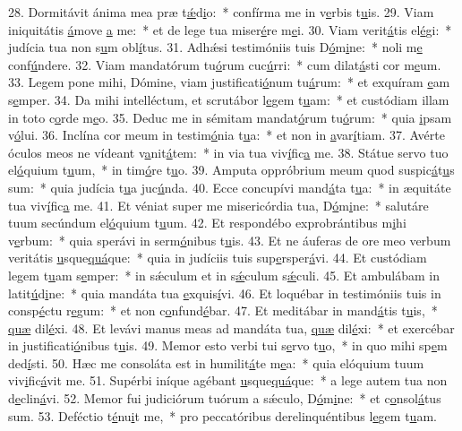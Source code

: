 28. Dormitávit ánima mea præ t\uline{ǽ}d\uline{i}o:~* confírma me in v\uline{e}rbis t\uline{u}is.
29. Viam iniquitátis \uline{á}move \uline{a} me:~* et de lege tua miser\uline{é}re m\uline{e}i.
30. Viam verit\uline{á}tis el\uline{é}gi:~* judícia tua non s\uline{u}m obl\uline{í}tus.
31. Adhǽsi testimóniis tuis D\uline{ó}m\uline{i}ne:~* noli m\uline{e} conf\uline{ú}ndere.
32. Viam mandatórum tu\uline{ó}rum cuc\uline{ú}rri:~* cum dilat\uline{á}sti cor m\uline{e}um.
33. Legem pone mihi, Dómine, viam justificati\uline{ó}num tu\uline{á}rum:~* et exquíram \uline{e}am s\uline{e}mper.
34. Da mihi intelléctum, et scrutábor l\uline{e}gem t\uline{u}am:~* et custódiam illam in toto c\uline{o}rde m\uline{e}o.
35. Deduc me in sémitam mandat\uline{ó}rum tu\uline{ó}rum:~* quia \uline{i}psam v\uline{ó}lui.
36. Inclína cor meum in testim\uline{ó}nia t\uline{u}a:~* et non in \uline{a}var\uline{í}tiam.
37. Avérte óculos meos ne vídeant v\uline{a}nit\uline{á}tem:~* in via tua viv\uline{í}fic\uline{a} me.
38. Státue servo tuo el\uline{ó}quium t\uline{u}um,~* in tim\uline{ó}re t\uline{u}o.
39. Amputa oppróbrium meum quod suspic\uline{á}t\uline{u}s sum:~* quia judícia t\uline{u}a juc\uline{ú}nda.
40. Ecce concupívi mand\uline{á}ta t\uline{u}a:~* in æquitáte tua viv\uline{í}fic\uline{a} me.
41. Et véniat super me misericórdia tua, D\uline{ó}m\uline{i}ne:~* salutáre tuum secúndum el\uline{ó}quium t\uline{u}um.
42. Et respondébo exprobrántibus m\uline{i}hi v\uline{e}rbum:~* quia sperávi in serm\uline{ó}nibus t\uline{u}is.
43. Et ne áuferas de ore meo verbum veritátis \uline{u}sque\uline{quá}que:~* quia in judíciis tuis sup\uline{e}rsper\uline{á}vi.
44. Et custódiam legem t\uline{u}am s\uline{e}mper:~* in sǽculum et in s\uline{ǽ}culum s\uline{ǽ}culi.
45. Et ambulábam in latit\uline{ú}d\uline{i}ne:~* quia mandáta tua \uline{e}xquis\uline{í}vi.
46. Et loquébar in testimóniis tuis in consp\uline{é}ctu r\uline{e}gum:~* et non c\uline{o}nfund\uline{é}bar.
47. Et meditábar in mand\uline{á}tis t\uline{u}is,~* \uline{quæ} dil\uline{é}xi.
48. Et levávi manus meas ad mandáta tua, \uline{quæ} dil\uline{é}xi:~* et exercébar in justificati\uline{ó}nibus t\uline{u}is.
49. Memor esto verbi tui s\uline{e}rvo t\uline{u}o,~* in quo mihi sp\uline{e}m ded\uline{í}sti.
50. Hæc me consoláta est in humilit\uline{á}te m\uline{e}a:~* quia elóquium tuum viv\uline{i}fic\uline{á}vit me.
51. Supérbi iníque agébant \uline{u}sque\uline{quá}que:~* a lege autem tua non d\uline{e}clin\uline{á}vi.
52. Memor fui judiciórum tuórum a sǽculo, D\uline{ó}m\uline{i}ne:~* et c\uline{o}nsol\uline{á}tus sum.
53. Deféctio t\uline{é}nu\uline{i}t me,~* pro peccatóribus derelinquéntibus l\uline{e}gem t\uline{u}am.

